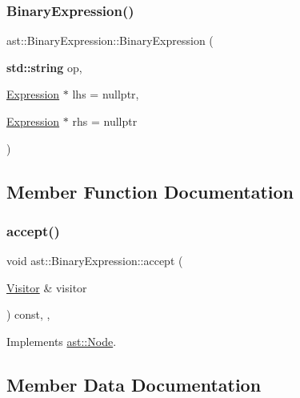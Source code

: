 \subsubsection{\texorpdfstring{Binary\+Expression()}{BinaryExpression()}}
{\footnotesize\ttfamily ast\+::\+Binary\+Expression\+::\+Binary\+Expression (\begin{DoxyParamCaption}\item[{\textbf{ std\+::string}}]{op,  }\item[{\hyperlink{structast_1_1_expression}{Expression} $\ast$}]{lhs = {\ttfamily nullptr},  }\item[{\hyperlink{structast_1_1_expression}{Expression} $\ast$}]{rhs = {\ttfamily nullptr} }\end{DoxyParamCaption})\hspace{0.3cm}{\ttfamily [inline]}}



\subsection{Member Function Documentation}
\mbox{\label{structast_1_1_binary_expression_ad962b349492ab7dc7365a5c6d7153d71}} 
\subsubsection{\texorpdfstring{accept()}{accept()}}
{\footnotesize\ttfamily void ast\+::\+Binary\+Expression\+::accept (\begin{DoxyParamCaption}\item[{\hyperlink{structast_1_1_visitor}{Visitor} \&}]{visitor }\end{DoxyParamCaption}) const\hspace{0.3cm}{\ttfamily [inline]}, {\ttfamily [override]}, {\ttfamily [virtual]}}



Implements \hyperlink{structast_1_1_node_abc089ee6caaf06a4445ebdd8391fdebc}{ast\+::\+Node}.



\subsection{Member Data Documentation}
\mbox{\label{structast_1_1_binary_expression_a1c8d523d75c0200e18b9511af135c292}} 
